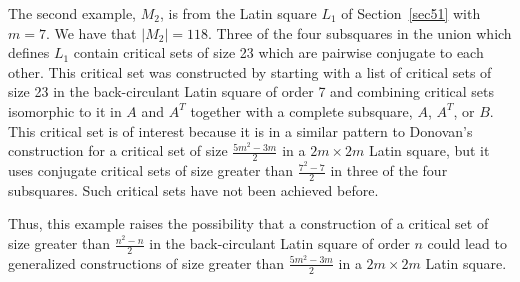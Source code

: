 \documentclass[12pt]{report}
\begin{document}
The second example, $M_2$, is from the Latin square $L_1$ of Section~\ref{sec51} with 
$m=7$.  We have
that $|M_2| = 118$. Three of the four subsquares in the union
which defines $L_1$ contain critical sets of size 23 which are pairwise
conjugate to each other.  This critical set was constructed by starting
with a list of critical sets of size 23 in the back-circulant Latin square
of order 7 and combining critical sets isomorphic to it in $A$ and $A^T$
together with a complete subsquare, $A$, $A^T$, or $B$.  This critical set
is of interest because it is in a similar pattern to Donovan's construction
for a critical set of size $\displaystyle{\frac{5m^2-3m}{2}}$ in a $2m
\times 2m$ Latin square, but it uses conjugate critical sets of size greater
than $\displaystyle{\frac{7^2-7}{2}}$ in three of the four subsquares.
Such critical sets have not been achieved before.

Thus, this example raises the possibility that a construction of a
critical set of size greater than $\displaystyle{\frac{n^2-n}{2}}$ in
the back-circulant Latin square of order $n$ could lead to generalized
constructions of size greater than $\displaystyle{\frac{5m^2-3m}{2}}$ in a
$2m \times 2m$ Latin square.

\vspace{5mm}
\end{document}
